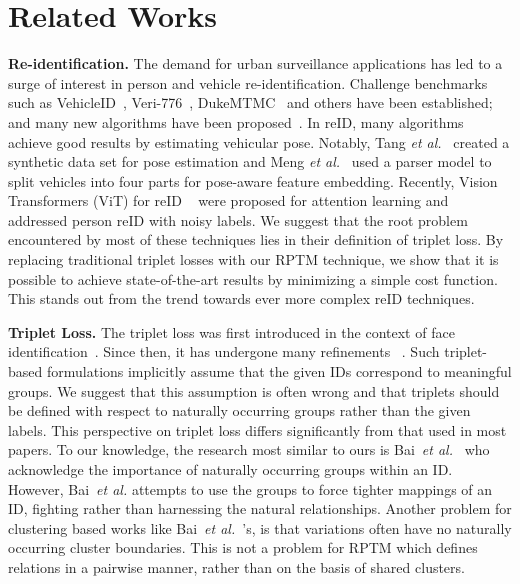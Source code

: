 \documentclass[10pt,twocolumn,letterpaper]{article}
\begin{document}
\section{Related Works}
\textbf{Re-identification.} 
The demand for urban surveillance applications has led to a surge of interest in person and vehicle re-identification. 
Challenge benchmarks such as VehicleID~\cite{liu2016deep}, Veri-776~\cite{liu2016large}, DukeMTMC~\cite{ristani2016performance} and others have been established; and many new algorithms have been proposed~\cite{he2020multi,khorramshahi2020devil,li2021diverse,liu2021spatial,sun2021tbe,zang2021learning}.
In reID, many algorithms achieve good results by estimating vehicular pose. 
Notably, Tang \textit{et al.}~\cite{tang2019pamtri} created a synthetic data set for pose estimation and Meng \textit{et al.}~\cite{meng2020parsing} used a parser model to split vehicles into four parts for pose-aware feature embedding. 
Recently, Vision Transformers (ViT) for reID ~\cite{he2021transreid,wang2022feature,zhu2022dual} were proposed for attention learning and \cite{Fu_2022_CVPR} addressed person reID with noisy labels. 
We suggest that the root problem encountered by most of these techniques lies in their definition of triplet loss. 
By replacing traditional triplet losses with our RPTM technique, we show that it is possible to achieve state-of-the-art results by minimizing a simple cost function.
This stands out from the trend towards ever more complex reID techniques. 


 

\textbf{Triplet Loss.}
The triplet loss was first introduced in the context of face identification~\cite{schroff2015facenet}. 
Since then, it has undergone many refinements
~\cite{bai2018group,hermans2017defense,xuan2020hard,xuan2020improved}.
Such triplet-based formulations implicitly assume that the given IDs correspond to meaningful groups. 
We suggest that this assumption is often wrong and that triplets should be defined with respect to naturally occurring groups rather than the given labels. 
This perspective on triplet loss differs significantly from that used in most papers. 
To our knowledge, the research most similar to ours is  Bai~\textit{et al.}~\cite{bai2018group} who acknowledge the importance of naturally occurring groups within an ID. 
However, Bai~\textit{et al.} attempts to use the groups to force tighter mappings of an ID,  fighting rather than harnessing the natural relationships. 
Another problem for clustering based works like  Bai~\textit{et al.}~\cite{bai2018group}'s, is that  variations often  have no  naturally occurring cluster boundaries. 
This is not a problem for RPTM which defines relations  in  a pairwise manner, rather than on the basis of shared clusters. 
\end{document}
